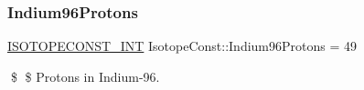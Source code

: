 \subsubsection{\texorpdfstring{Indium96\+Protons}{Indium96Protons}}
{\footnotesize\ttfamily \mbox{\hyperlink{group___isotope_const-_macros_ga5f18360b3e99483a35c32d789e62621c}{I\+S\+O\+T\+O\+P\+E\+C\+O\+N\+S\+T\+\_\+\+I\+NT}} Isotope\+Const\+::\+Indium96\+Protons = 49}

\$ \$ Protons in Indium-\/96. 